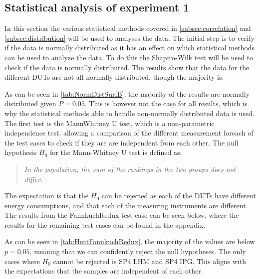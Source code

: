 \subsection{Statistical analysis of experiment 1}\label{subsec:Stat1}

In this section the various statistical methods covered in \cref{subsec:correlation} and \cref{subsec:distribution} will be used to analyses the data. The initial step is to verify if the data is normally distributed as it has an effect on which statistical methods can be used to analyze the data. To do this the Shapiro-Wilk test will be used to check if the data is normally distributed. The results show that the data for the different DUTs are not all normally distributed, though the majority is.



As can be seen in \cref{tab:NormDistSurfB}, the majority of the results are normally distributed given $P = 0.05$. This is however not the case for all results, which is why the statistical methods able to handle non-normally distributed data is used. The first test is the MannWhitney U test, which is a non-parametric independence test, allowing a comparison of the different measurement foreach of the test cases to check if they are are independent from each other. The null hypothesis $H_0$ for the Mann-Whitney U test is defined as:

\begin{quote}
    \textit{In the population, the sum of the rankings in the two groups does not differ.}
\end{quote}

The expectation is that the $H_0$ can be rejected as each of the DUTs have different energy consumptions, and that each of the measuring instruments are different.
The results from the FannkuchRedux test case can be seen below, where the results for the remaining test cases can be found in the appendix.
 

As can be seen in \cref{tab:HeatFannkuchRedux}, the majority of the values are below $p = 0.05$, meaning that we can confidently reject the null hypotheses. The only cases where $H_0$ cannot be rejected is SP4 LHM and SP4 IPG. This aligns with the expectations that the samples are independent of each other.

